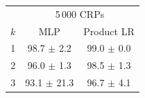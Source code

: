 \begin{tabular}{ccc}
\toprule
 & \multicolumn{2}{c}{5\,000 CRPs} \\
$k$ & MLP & Product LR \\
\midrule
1 & 98.7 $\pm$ 2.2 & 99.0 $\pm$ 0.0 \\
2 & 96.0 $\pm$ 1.3 & 98.5 $\pm$ 1.3 \\
3 & 93.1 $\pm$ 21.3 & 96.7 $\pm$ 4.1 \\
\bottomrule
\end{tabular}
